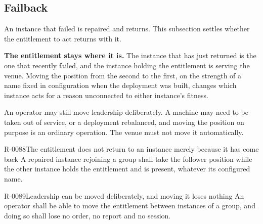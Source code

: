 \subsection{Failback}
\label{sec:ha:enabled:failback}

An instance that failed is repaired and returns. This subsection settles whether
the entitlement to act returns with it.

\textbf{The entitlement stays where it is.} The instance that has just returned
is the one that recently failed, and the instance holding the entitlement is
serving the venue. Moving the position from the second to the first, on the
strength of a name fixed in configuration when the deployment was built, changes
which instance acts for a reason unconnected to either instance's fitness.

An operator may still move leadership deliberately. A machine may need to be
taken out of service, or a deployment rebalanced, and moving the position on
purpose is an ordinary operation. The venue must not move it automatically.

\begin{requirement}{R-0088}{The entitlement does not return to an instance merely because it has come back}
  A repaired instance rejoining a group shall take the follower position while
  the other instance holds the entitlement and is present, whatever its
  configured name.
\end{requirement}

\begin{requirement}{R-0089}{Leadership can be moved deliberately, and moving it loses nothing}
  An operator shall be able to move the entitlement between instances of a group,
  and doing so shall lose no order, no report and no session.
\end{requirement}

